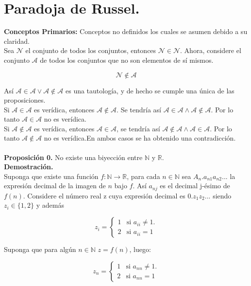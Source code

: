 \section{Paradoja de Russel.}
\textbf{Conceptos Primarios:} Conceptos no definidos los cuales se asumen debido a su claridad.\\

Sea $\mathcal{N}$ el conjunto de todos los conjuntos, entonces $\mathcal{N} \in \mathcal{N}$. Ahora, considere el conjunto $\mathcal{A}$ de todos los conjuntos que no son elementos de sí mismos. 

\[ \mathcal{N} \notin \mathcal{A} \]

Así $\mathcal{A} \in \mathcal{A} \vee \mathcal{A}\notin\mathcal{A}$ es una tautología, y de hecho se cumple una única de las proposiciones.\\

Si $\mathcal{A} \in \mathcal{A}$ es verídica, entonces $\mathcal{A} \notin \mathcal{A}$. Se tendría así $\mathcal{A} \in \mathcal{A} \wedge	\mathcal{A} \notin \mathcal{A}$. Por lo tanto $\mathcal{A} \in \mathcal{A}$ no es verídica.\\

Si $\mathcal{A} \notin \mathcal{A}$ es verídica, entonces $\mathcal{A} \in \mathcal{A}$, se tendría así  $\mathcal{A} \notin \mathcal{A} \wedge \mathcal{A} \in \mathcal{A}$. Por lo tanto  $\mathcal{A} \notin \mathcal{A}$ no es verídica.En ambos casos se ha obtenido una contradicción.\\
\medskip
\\
\textbf{Proposición 0.} No existe una biyección entre $\mathbb{N}$ y $\mathbb{R}$.\\
\textbf{Demostración.}\\
Suponga que existe una función $f:\mathbb{N}\longrightarrow\mathbb{R}$, para cada $n \in \mathbb{N}$ sea
$A_{n}.a_{n1}a_{n2}...$ la expresión decimal de la imagen de $n$ bajo $f$. Así $a_{nj}$ es el decimal j-ésimo de $f(n).$ Considere el número real z cuya expresión decimal es $0.z_{1}z_{2}...$ siendo $z_i \in \{1,2\}$ y además

\[z_i = \left \{ \begin{matrix} 1 & \mbox{si }a_{ii}\neq1.
\\ 2 & \mbox{si } a_{ii}=1\end{matrix}\right. \]

Suponga que para algún $n \in \mathbb{N}$ $z=f(n)$, luego:

\[z_n = \left \{ \begin{matrix} 1 & \mbox{si }a_{nn}\neq1.
\\ 2 & \mbox{si } a_{nn}=1\end{matrix}\right. \]

